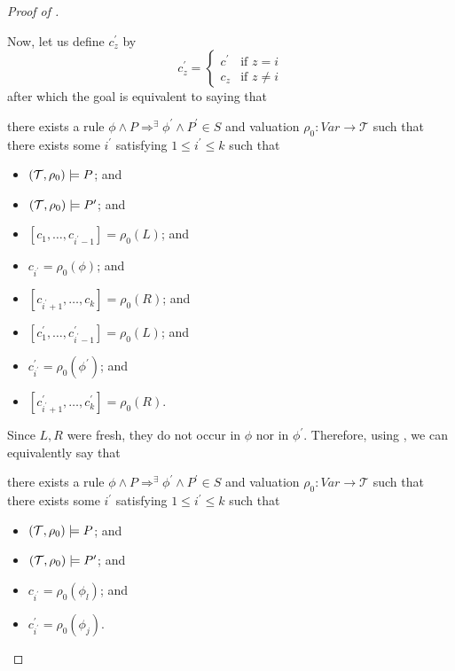 \begin{proof}[Proof of ]
\begin{proofenv}
\end{proofenv}
Now, let us define $c^\prime_{z}$ by
\begin{equation*}
c^\prime_{z} =
    \begin{cases}
        c^\prime & \text{if } z = i \\
        c_z & \text{if } z \not = i
    \end{cases}
\end{equation*}
after which the goal is equivalent to saying that
\begin{proofenv}
there exists a rule $\phi \land P \Rightarrow^\exists \phi^\prime \land P^\prime \in S$
and valuation $\rho_0 : \mathit{Var} \to \mathcal{T}$ such that
there exists some $i^\prime$ satisfying $1 \leq i^\prime \leq k$ such that
\begin{itemize}
    \item $(\mathcal{T}, \rho_0) \models P$; and
    \item $(\mathcal{T}, \rho_0) \models P^\prime$; and
    \item $[c_1,\ldots, c_{i^\prime-1}] = \rho_0(L)$; and
    \item $c_{i^\prime} = \rho_0(\phi)$; and
    \item $[c_{i^\prime+1},\ldots,c_k] = \rho_0(R)$; and
    \item $[c^\prime_1,\ldots, c^\prime_{i^\prime-1}] = \rho_0(L)$; and
    \item $c^\prime_{i^\prime} = \rho_0(\phi^\prime)$; and
    \item $[c^\prime_{i^\prime+1},\ldots,c^\prime_k] = \rho_0(R)$.
\end{itemize}
\end{proofenv}
Since $L,R$ were fresh, they do not occur in $\phi$ nor in $\phi^\prime$.
Therefore, using , we can equivalently say that
\begin{proofenv}
there exists a rule $\phi \land P \Rightarrow^\exists \phi^\prime \land P^\prime \in S$
and valuation $\rho_0 : \mathit{Var} \to \mathcal{T}$ such that
there exists some $i^\prime$ satisfying $1 \leq i^\prime \leq k$
such that
\begin{itemize}
    \item $(\mathcal{T}, \rho_0) \models P$; and
    \item $(\mathcal{T}, \rho_0) \models P^\prime$; and
    \item $c_{i^\prime} = \rho_0(\phi_l)$; and
    \item $c^\prime_{i^\prime} = \rho_0(\phi_j)$.
\end{itemize}

\end{proofenv}
\end{proof}
